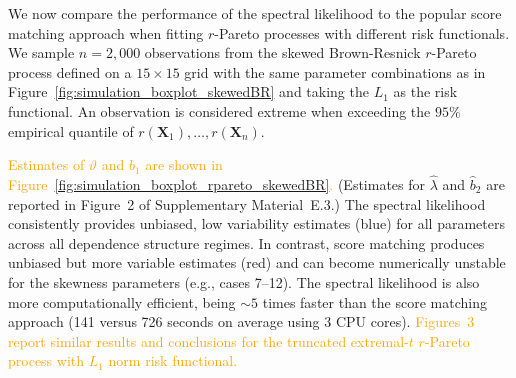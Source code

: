 \documentclass[12pt]{article}
\newcommand{\PZ}{\textcolor{orange}}
\begin{document}
We now compare the performance of the spectral likelihood to the popular score matching approach \citep[see][]{deFondeville.Davison:2018} when fitting $r$-Pareto processes with different risk functionals.
%
We sample $n=2,000$ observations from the skewed Brown-Resnick $r$-Pareto process defined on a $15\times15$ grid with the same parameter combinations as in Figure~\ref{fig:simulation_boxplot_skewedBR} and taking the $L_1$ as the risk functional. An observation is considered extreme when exceeding the 
$95\%$ empirical quantile of $r(\bm X_1),\dots,r(\bm X_n)$.

\PZ{Estimates of $\vartheta$ and $b_1$ are shown in Figure~\ref{fig:simulation_boxplot_rpareto_skewedBR}. }
(Estimates for $\hat{\lambda}$ and $\hat{b}_2$ are reported in Figure~2 of Supplementary Material~E.3.)
%
The spectral likelihood consistently provides unbiased, low variability estimates (blue) for all 
parameters
across all dependence structure regimes. 
%
In contrast, score matching produces unbiased but more variable estimates (red) 
and can become
numerically unstable for the skewness parameters (e.g., cases 7--12).
% 
The spectral likelihood is also more computationally efficient, being ${\sim}5$ times faster than the score matching approach (141 versus 726 seconds on average using 3 CPU cores). 
%
\PZ{Figures~3 report similar results and conclusions for the truncated extremal-$t$ $r$-Pareto process with $L_1$ norm risk functional.}
\end{document}
